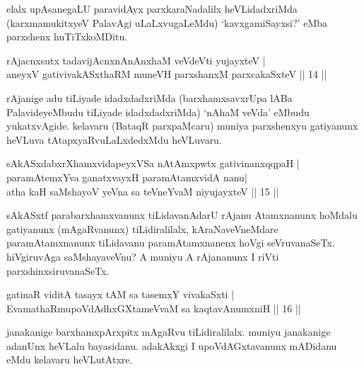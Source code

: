 \begin{artha}
elalx upAsanegaLU paravidAyx parxkaraNadalilx heVLidadxriMda (karxmamukitxyeV PalavAgi uLaLxvugaLeMdu) `kavxgamiSayxsi?' eMba parxshenx huTiTxkoMDitu.
\end{artha}


\begin{shl}
rAjacnxsutx tadavijAcnxnAnAnxhaM veVdeVti yujayxteV |\\
aneyxV gativivakASxthaRM muneVH parxshanxM parxcakaSxteV \hfill || 14 || 
\end{shl}

\begin{artha}
rAjanige adu tiLiyade idadxdadxriMda (barxhamxsavxrUpa lABa PalavideyeMbudu tiLiyade idadxdadxriMda) `nAhaM veVda' eMbudu yukatxvAgide. kelavaru (BataqR parxpaMcaru) muniya parxshenxyu gatiyanunx heVLuva tAtapxyaRvuLaLxdedxMdu heVLuvaru.
\end{artha}


\begin{shl}
sAkASxdabxrXhamxvidapeyxVSa nA\s \s tAmxpwtx gativinanxqqpaH |\\
paramAtemxYva ganatxvayxH paramAtamxvidA nanu|\\
atha kaH saMshayoV yeVna sa teVneYvaM niyujayxteV \hfill || 15 || 
\end{shl}

\begin{artha}
sAkASxtf parabarxhamxvanunx tiLidavanAdarU rAjanu Atamxnanunx hoMdalu gatiyanunx (mAgaRvanunx) tiLidiralilalx, kAraNaveVneMdare paramAtamxnanunx tiLidavanu paramAtamxnanenx hoVgi seVruvanaSeTx. hiVgiruvAga saMshayaveVnu? A muniyu A rAjananunx I riVti parxshinxsiruvanaSeTx.
\end{artha}


\begin{shl}
gatinaR viditA tasayx tAM sa tasemxY vivakaSxti |\\
EvamathaRmupoVdAdhxGXtameVvaM sa kaqtavAnumxniH \hfill || 16 || 
\end{shl}

\begin{artha}
janakanige barxhamxpArxpitx mAgaRvu tiLidiralilalx. muniyu janakanige adanUnx heVLalu bayasidanu. adakAkxgi I upoVdAGxtavanunx mADidanu eMdu kelavaru heVLutAtxre.
\end{artha}


